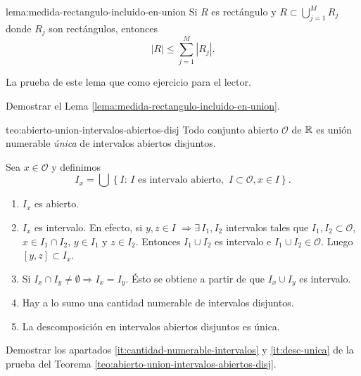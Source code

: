 \begin{lema}{lema:medida-rectangulo-incluido-en-union}
Si $R$ es rect\'angulo y $R\subset \bigcup\limits_{j=1}^M R_j$ donde
$R_j$ son rect\'angulos, entonces
\[
|R|\leq \sum\limits_{j=1}^M |R_j|. 
\]
\end{lema}

\begin{demo}
La prueba de este lema que como ejercicio para el lector. 
\end{demo}


\begin{ejercicio}{}
Demostrar el  Lema \ref{lema:medida-rectangulo-incluido-en-union}.
\end{ejercicio}


\begin{teorema}{teo:abierto-union-intervalos-abiertos-disj}
Todo conjunto abierto $\mathcal{O}$ de $\mathbb{R}$ es uni\'on numerable \emph{\'unica} de intervalos abiertos disjuntos.
\end{teorema}

\begin{demo}
Sea $x \in \mathcal{O}$ y definimos 
\[
I_x=\bigcup \left\{  
I:\,I\mbox{ es intervalo abierto, }\, I\subset \mathcal{O}, x \in I
\right\}.
\]
\begin{enumerate}
    \item $I_x$ es abierto.
    \item $I_x$ es intervalo. En efecto, si $y,z\in I$ $\Rightarrow \exists\, I_1,I_2$ intervalos tales que $I_1,I_2\subset \mathcal{O}$, 
    $x \in I_1\cap I_2$, $y \in I_1$ y $z\in I_2$. 
    Entonces $I_1\cup I_2$ es intervalo e $I_1\cup I_2 \in \mathcal{O}$. Luego  $[y,z]\subset I_x$. 
    \item Si $I_x \cap I_y \neq \emptyset \Rightarrow I_x=I_y$.
    \'Esto se obtiene a partir de que $I_x \cup I_y$ es intervalo.
    \item\label{it:cantidad-numerable-intervalos} Hay a lo sumo una cantidad numerable de intervalos disjuntos.
    \item \label{it:desc-unica}La descomposici\'on en intervalos abiertos disjuntos es \'unica.
    \end{enumerate}
\end{demo}

\begin{ejercicio}{}
Demostrar  los apartados \ref{it:cantidad-numerable-intervalos} y \ref{it:desc-unica} de la prueba del Teorema \ref{teo:abierto-union-intervalos-abiertos-disj}.
\end{ejercicio}


